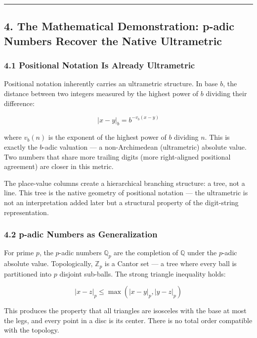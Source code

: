 \documentclass[
]{article}
\begin{document}
\begin{center}\rule{0.5\linewidth}{0.5pt}\end{center}

\subsection{4. The Mathematical Demonstration: p-adic Numbers Recover
the Native
Ultrametric}\label{the-mathematical-demonstration-p-adic-numbers-recover-the-native-ultrametric}

\subsubsection{4.1 Positional Notation Is Already
Ultrametric}\label{positional-notation-is-already-ultrametric}

Positional notation inherently carries an ultrametric structure. In base
\(b\), the distance between two integers measured by the highest power
of \(b\) dividing their difference:

\[|x - y|_b = b^{-v_b(x-y)}\]

where \(v_b(n)\) is the exponent of the highest power of \(b\) dividing
\(n\). This is exactly the \(b\)-adic valuation --- a non-Archimedean
(ultrametric) absolute value. Two numbers that share more trailing
digits (more right-aligned positional agreement) are closer in this
metric.

The place-value columns create a hierarchical branching structure: a
tree, not a line. This tree is the native geometry of positional
notation --- the ultrametric is not an interpretation added later but a
structural property of the digit-string representation.

\subsubsection{4.2 p-adic Numbers as
Generalization}\label{p-adic-numbers-as-generalization}

For prime \(p\), the \(p\)-adic numbers \(\mathbb{Q}_p\) are the
completion of \(\mathbb{Q}\) under the \(p\)-adic absolute value.
Topologically, \(\mathbb{Z}_p\) is a Cantor set --- a tree where every
ball is partitioned into \(p\) disjoint sub-balls. The strong triangle
inequality holds:

\[|x - z|_p \leq \max(|x - y|_p, |y - z|_p)\]

This produces the property that all triangles are isosceles with the
base at most the legs, and every point in a disc is its center. There is
no total order compatible with the topology.
\end{document}
